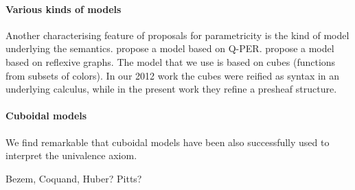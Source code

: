 \documentclass[english]{PaperTools/latex/lipics}
\begin{document}
\paragraph{Various kinds of models}
Another characterising feature of proposals for parametricity is the
kind of model underlying the
semantics.  propose a model
based on Q-PER.  propose a model based
on reflexive graphs. The model that we use is based on cubes
(functions from subsets of colors). In
our 2012 work the cubes were reified as syntax in
an underlying calculus, while in the present work they refine a presheaf structure.

\paragraph{Cuboidal models}

We find remarkable that cuboidal models have been also successfully
used to interpret the univalence axiom.

Bezem, Coquand, Huber?
Pitts?



\end{document}
